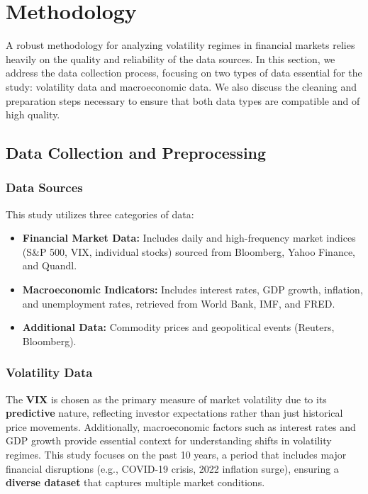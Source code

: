 \chapter{Methodology}

A robust methodology for analyzing volatility regimes in financial markets relies heavily on the quality and reliability of the data sources. In this section, we address the data collection process, focusing on two types of data essential for the study: volatility data and macroeconomic data. We also discuss the cleaning and preparation steps necessary to ensure that both data types are compatible and of high quality.

\section{Data Collection and Preprocessing}

\subsection{Data Sources}

This study utilizes three categories of data:

\begin{itemize}

    \item \textbf{Financial Market Data:} Includes daily and high-frequency market indices (S\&P 500, VIX, individual stocks) sourced from Bloomberg, Yahoo Finance, and Quandl.
    \item \textbf{Macroeconomic Indicators:} Includes interest rates, GDP growth, inflation, and unemployment rates, retrieved from World Bank, IMF, and FRED.
    \item \textbf{Additional Data:} Commodity prices and geopolitical events (Reuters, Bloomberg).

\end{itemize}

\subsection{Volatility Data}
The \textbf{VIX} is chosen as the primary measure of market volatility due to its \textbf{predictive} nature, reflecting investor expectations rather than just historical price movements. Additionally, macroeconomic factors such as interest rates and GDP growth provide essential context for understanding shifts in volatility regimes. This study focuses on the past 10 years, a period that includes major financial disruptions (e.g., COVID-19 crisis, 2022 inflation surge), ensuring a \textbf{diverse dataset} that captures multiple market conditions.


